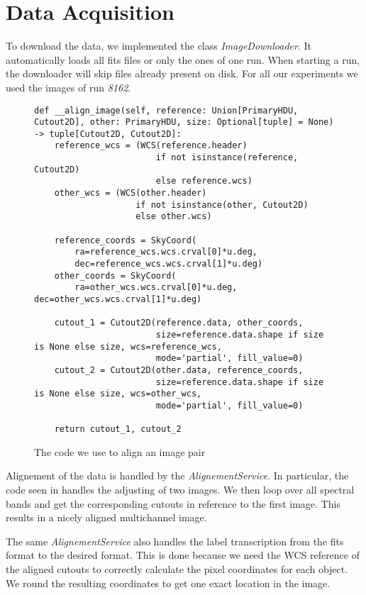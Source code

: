 \section{Data Acquisition}
To download the data, we implemented the class \emph{ImageDownloader}. It automatically loads all fits files or only the ones of one run. When starting a run, the downloader will skip files already present on disk.
For all our experiments we used the images of run \emph{8162}.

\begin{figure}
    \begin{verbatim}
def __align_image(self, reference: Union[PrimaryHDU, Cutout2D], other: PrimaryHDU, size: Optional[tuple] = None) -> tuple[Cutout2D, Cutout2D]:
    reference_wcs = (WCS(reference.header)
                        if not isinstance(reference, Cutout2D)
                        else reference.wcs)
    other_wcs = (WCS(other.header)
                    if not isinstance(other, Cutout2D)
                    else other.wcs)

    reference_coords = SkyCoord(
        ra=reference_wcs.wcs.crval[0]*u.deg,
        dec=reference_wcs.wcs.crval[1]*u.deg)
    other_coords = SkyCoord(
        ra=other_wcs.wcs.crval[0]*u.deg, dec=other_wcs.wcs.crval[1]*u.deg)

    cutout_1 = Cutout2D(reference.data, other_coords,
                        size=reference.data.shape if size is None else size, wcs=reference_wcs,
                        mode='partial', fill_value=0)
    cutout_2 = Cutout2D(other.data, reference_coords,
                        size=reference.data.shape if size is None else size, wcs=other_wcs,
                        mode='partial', fill_value=0)

    return cutout_1, cutout_2
        \end{verbatim}
    \label{alignementCode}
    \caption{The code we use to align an image pair}
\end{figure}

Alignement of the data is handled by the \emph{AlignementService}. In particular, the code seen in  handles the adjusting of two images. We then loop over all spectral bands and get the corresponding cutouts in reference to the first image. This results in a nicely aligned multichannel image.

The same \emph{AlignementService} also handles the label transcription from the fits format to the desired format. This is done because we need the WCS reference of the aligned cutouts to correctly calculate the pixel coordinates for each object.
We round the resulting coordinates to get one exact location in the image.

